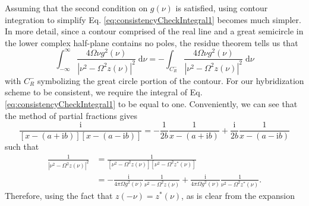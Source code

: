 Assuming that the second condition on $g(\nu)$ is satisfied, using contour integration to simplify Eq. \eqref{eq:consistencyCheckIntegral1} becomes much simpler. In more detail, since a contour comprised of the real line and a great semicircle in the lower complex half-plane contains no poles, the residue theorem tells us that
\begin{equation}
\int_{-\infty}^\infty\frac{4\Omega\nu g^2(\nu)}{|\nu^2 - \Omega ^2z(\nu)|^2}\;\mathrm{d}\nu = -\int_{C_R^-}\frac{4\Omega\nu g^2(\nu)}{|\nu^2 - \Omega ^2z(\nu)|^2}\;\mathrm{d}\nu
\end{equation}
with $C_R^-$ symbolizing the great circle portion of the contour. For our hybridization scheme to be consistent, we require the integral of Eq. \eqref{eq:consistencyCheckIntegral1} to be equal to one. Conveniently, we can see that the method of partial fractions gives
\begin{equation}
\frac{\mathrm{i}}{[x - (a + \mathrm{i}b)][x - (a - \mathrm{i}b)]} = -\frac{1}{2b}\frac{1}{x - (a + \mathrm{i}b)} + \frac{\mathrm{i}}{2b}\frac{1}{x - (a - \mathrm{i}b)}
\end{equation}
such that
\begin{equation}
\begin{split}
\frac{1}{|\nu^2 - \Omega^2z(\nu)|^2} &= \frac{1}{[\nu^2 - \Omega^2z(\nu)][\nu^2 - \Omega^2z^*(\nu)]}\\
& = -\frac{\mathrm{i}}{4\pi\Omega g^2(\nu)}\frac{1}{\nu^2 - \Omega^2z(\nu)} + \frac{\mathrm{i}}{4\pi\Omega g^2(\nu)}\frac{1}{\nu^2 - \Omega^2z^*(\nu)}.
\end{split}
\end{equation}
Therefore, using the fact that $z(-\nu) = z^*(\nu)$, as is clear from the expansion

